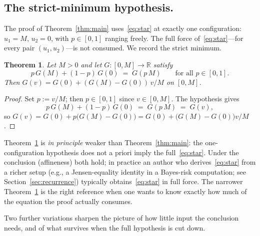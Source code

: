 \documentclass{article}
\theoremstyle{plain}
\newtheorem{theorem}{Theorem}
\theoremstyle{definition}
\newcommand{\R}{\mathbb{R}}
\begin{document}
\subsection{The strict-minimum hypothesis.}
\label{ssec:weak}

The proof of Theorem~\ref{thm:main} uses~\eqref{eq:star} at exactly one
configuration: $u_1=M$, $u_2=0$, with $p\in[0,1]$ ranging freely. The
full force of~\eqref{eq:star}---for every pair $(u_1,u_2)$---is not
consumed. We record the strict minimum.

\begin{theorem}\label{thm:weak}
Let $M>0$ and let $G\colon[0,M]\to\R$ satisfy
\[
p\,G(M)+(1-p)\,G(0) \;=\; G(p\,M) \qquad \text{for all }p\in[0,1].
\]
Then $G(v)=G(0)+(G(M)-G(0))\,v/M$ on $[0,M]$.
\end{theorem}

\begin{proof}
Set $p:=v/M$; then $p\in[0,1]$ since $v\in[0,M]$. The hypothesis gives
\[
p\,G(M)+(1-p)\,G(0) \;=\; G(p\,M) \;=\; G(v),
\]
so $G(v)=G(0)+p\bigl(G(M)-G(0)\bigr)=G(0)+\bigl(G(M)-G(0)\bigr)v/M$.
\end{proof}

Theorem~\ref{thm:weak} is \emph{in principle} weaker than
Theorem~\ref{thm:main}: the one-configuration hypothesis does not a priori imply
the full~\eqref{eq:star}. Under the conclusion (affineness) both hold;
in practice an author who derives~\eqref{eq:star} from a richer setup
(e.g., a Jensen-equality identity in a Bayes-risk computation;
see Section~\ref{sec:recurrence}) typically obtains~\eqref{eq:star} in
full force. The narrower Theorem~\ref{thm:weak} is the right reference
when one wants to know exactly how much of the equation the proof
actually consumes.

Two further variations sharpen the picture of how little input the
conclusion needs, and of what survives when the full hypothesis is cut
down.
\end{document}
